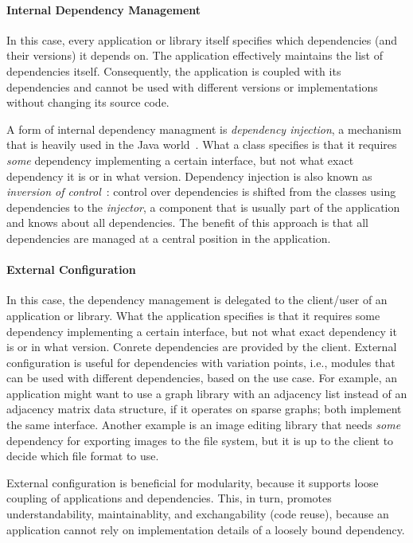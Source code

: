 \paragraph{Internal Dependency Management}
In this case, every application or library itself specifies which dependencies (and their versions) it depends on. The application effectively maintains the list of dependencies itself. Consequently, the application is coupled with its dependencies and cannot be used with different versions or implementations without changing its source code.

A form of internal dependency managment is \emph{dependency injection}, a mechanism that is heavily used in the Java world~\cite{Prasanna:2009:DI:1795686}. What a class specifies is that it requires \emph{some} dependency implementing a certain interface, but not what exact dependency it is or in what version. Dependency injection is also known as \emph{inversion of control}~\cite{fowlerioc}: control over dependencies is shifted from the classes using dependencies to the \emph{injector}, a component that is usually part of the application and knows about all dependencies. The benefit of this approach is that all dependencies are managed at a central position in the application.

\paragraph{External Configuration}
In this case, the dependency management is delegated to the client/user of an application or library. What the application specifies is that it requires some dependency implementing a certain interface, but not what exact dependency it is or in what version. Conrete dependencies are provided by the client. External configuration is useful for dependencies with variation points, i.e., modules that can be used with different dependencies, based on the use case. For example, an application might want to use a graph library with an adjacency list instead of an adjacency matrix data structure, if it operates on sparse graphs; both implement the same interface. Another example is an image editing library that needs \emph{some} dependency for exporting images to the file system, but it is up to the client to decide which file format to use. 

External configuration is beneficial for modularity, because it supports loose coupling of applications and dependencies. This, in turn, promotes understandability, maintainablity, and exchangability (code reuse), because an application cannot rely on implementation details of a loosely bound dependency.

